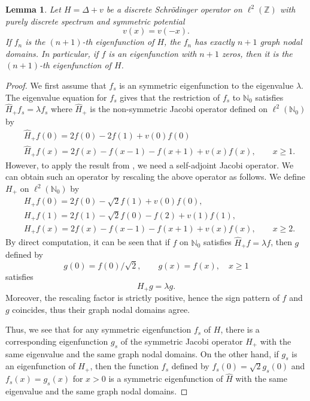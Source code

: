 \documentclass[12pt, reqno]{amsart}
\newtheorem{lemma}[theorem]{Lemma}
\theoremstyle{definition}
\numberwithin{equation}{section}
\newcommand{\Z}{{\mathbb Z}}
\begin{document}
\begin{lemma}\label{lem: zeros of excited states}
  Let $H=\Delta+v$ be a discrete Schr\"odinger operator on  $\ell^2( \Z)$ with purely discrete spectrum and symmetric potential 
  \begin{equation*}
  	v(x) = v(-x).
  \end{equation*} If $f_n$ is the $(n+1)$-th eigenfunction of $H$, the $f_n$ has exactly $n+1$ graph nodal domains. In particular, if $f$ is an eigenfunction with $n+1$ zeros, then it is the $(n+1)$-th eigenfunction of $H$.
  \end{lemma}
\begin{proof}
    We first assume that $f_s$ is an  symmetric eigenfunction to the eigenvalue $\lambda$. The eigenvalue equation for $f_s$ gives that the restriction of $f_s$ to $\mathbb{N}_0$ satisfies $\hat H_+ f_s = \lambda f_s$ where $\hat H_+$ is the non-symmetric Jacobi operator defined on $\ell^2(\mathbb{N}_0)$ by
\begin{align*} 
    & \hat H_+ f(0) = 2f(0)-2f(1) + v(0)f(0) \\
&\hat H_+ f(x) = 2f(x)-f(x-1)-f(x+1) + v(x)f(x),\qquad x\ge 1.
    \end{align*}
  However, to apply the result from \cite{Teschl2000}, we need a self-adjoint Jacobi operator. We can obtain such an operator by rescaling the above operator as follows. We define $ H_+$ on $\ell^2(\mathbb{N}_0)$ by  
  \begin{align*}
		&{H_+} f(0) = 2f(0)-\sqrt{2}f(1)+v(0)f(0),\\
		&{H_+} f(1) = 2f(1) -\sqrt{2}f(0)-f(2)+v(1)f(1),\\
		&{H_+} f(x) = 2f(x)- f(x-1)-f(x+1)+v(x)f(x),\qquad x\ge 2.
	\end{align*} 
    By direct computation,
    it can be seen that if $f$ on $\mathbb{N}_0$ satisfies $\hat H_+ f = \lambda f$, then $g$ defined by $$g(0) = f(0)/\sqrt{2},\qquad g(x) = f(x),\quad x\ge 1$$ satisfies $$ H_+ g = \lambda g. $$ 
    Moreover, the rescaling factor is strictly positive, hence the sign pattern of $f$ and $g$ coincides, thus their graph nodal domains agree. 

    Thus, we see that for any symmetric eigenfunction $f_s$ of $H$, there is a corresponding eigenfunction $g_s$ of the symmetric Jacobi operator $H_+$ with the same eigenvalue and the same graph nodal domains. On the other hand, if $g_s$ is an eigenfunction of $H_+$, then the function $f_s$ defined by $f_s(0) = \sqrt{2}g_s(0)$ and $f_s(x) = g_s(x)$ for $x>0$ is a symmetric eigenfunction of $\hat H$ with the same eigenvalue and the same graph nodal domains.


\end{proof}
\end{document}
